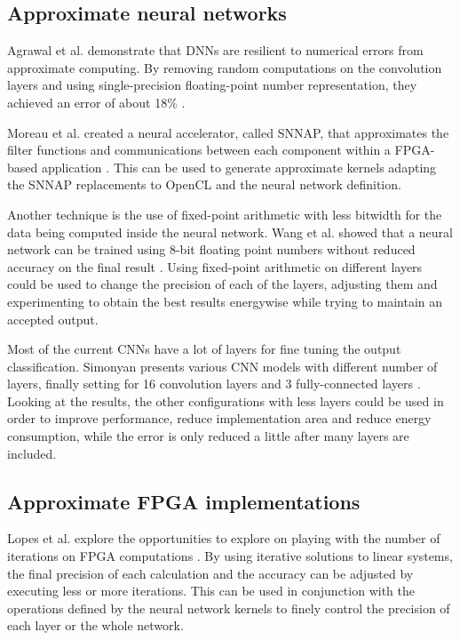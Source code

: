 \subsection{Approximate neural networks}

Agrawal et al. demonstrate that DNNs are resilient to numerical errors
from approximate computing. By removing random computations on the convolution layers 
and using single-precision floating-point number representation, they achieved an error
of about 18\% \cite{approximatecomp}.

Moreau et al. created a neural accelerator, called SNNAP, that approximates the filter functions and
communications between each component within a FPGA-based application \cite{moreau2015snnap}. This can be used
to generate approximate kernels adapting the SNNAP replacements to OpenCL and the neural network
definition.

Another technique is the use of fixed-point arithmetic with less bitwidth for the data being
computed inside the neural network. Wang et al. showed that a neural network can be 
trained using 8-bit floating point numbers without reduced accuracy on the final result \cite{wang2018training}.
Using fixed-point arithmetic on different layers could be used to change the precision of
each of the layers, adjusting them and experimenting to obtain the best results energywise
while trying to maintain an accepted output.

Most of the current CNNs have a lot of layers for fine tuning the output classification.
Simonyan presents various CNN models with different number of layers, finally setting for
16 convolution layers and 3 fully-connected layers \cite{simonyan2014very}. Looking at the 
results, the other configurations with less layers could be used in order to improve performance,
reduce implementation area and reduce energy consumption, while the error is only
reduced a little after many layers are included.

\subsection{Approximate FPGA implementations}

Lopes et al. explore the opportunities to explore on playing with the number of iterations
on FPGA computations \cite{roldao2009more}. By using iterative solutions to linear systems, 
the final precision of each calculation and the accuracy can 
be adjusted by executing less or more iterations.
This can be used in conjunction with the operations defined by the neural network kernels 
to finely control the precision of each layer or the whole network.

